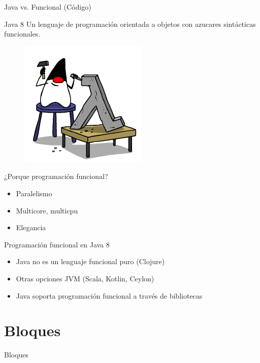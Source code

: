 \documentclass{beamer}
\begin{document}
\begin{frame}{Java vs. Funcional (Código)}
\end{frame}

\begin{frame}{Java 8}
Un lenguaje de programación orientada a objetos con azucares sintácticas funcionales.
			\begin{figure}
			\centering
			\includegraphics[width=0.5\linewidth]{Images/JavaLam-1}
			\end{figure}
\end{frame}

\begin{frame}{¿Porque programación funcional?}
	\begin{itemize}
	\item Paralelismo
	\item Multicore, multicpu
	\item Elegancia
	\end{itemize}
\end{frame}

\begin{frame}{Programación funcional en Java 8}
	\begin{itemize}
	\item Java no es un lenguaje funcional puro (Clojure)
	\item Otras opciones JVM (Scala, Kotlin, Ceylon)
	\item Java soporta programación funcional a través de bibliotecas
	\end{itemize}
\end{frame}

\section{Bloques}
\begin{frame}
\huge Bloques
\end{frame}
\end{document}
